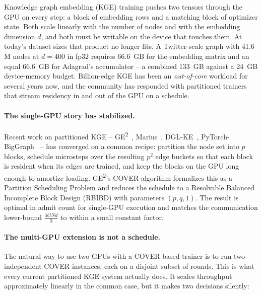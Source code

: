 %

Knowledge graph embedding (KGE) training pushes two tensors through
the GPU on every step: a block of embedding rows and a matching block
of optimizer state. Both scale linearly with the number of nodes and
with the embedding dimension $d$, and both must be writable on the
device that touches them. At today's dataset sizes that product no
longer fits. A Twitter-scale graph with 41.6\,M nodes at $d\!=\!400$ in
fp32 requires \SI{66.6}{GB} for the embedding matrix and an equal
\SI{66.6}{GB} for Adagrad's accumulator -- a combined \SI{133}{GB}
against a \SI{24}{GB} device-memory budget. Billion-edge KGE
has been an \emph{out-of-core} workload for several years now, and the
community has responded with partitioned trainers that stream
residency in and out of the GPU on a schedule.

\paragraph{The single-GPU story has stabilized.}
Recent work on partitioned KGE -- GE\textsuperscript{2}~\cite{ge2_report},
Marius~\cite{marius}, DGL-KE~\cite{dgl_ke}, PyTorch-BigGraph~\cite{pytorch_biggraph} --
has converged on a common recipe: partition the node set into $p$
blocks, schedule microsteps over the resulting $p^2$ edge buckets so
that each block is resident when its edges are trained, and keep the
blocks on the GPU long enough to amortize loading. GE\textsuperscript{2}'s
COVER algorithm formalizes this as a Partition Scheduling Problem and
reduces the schedule to a Resolvable Balanced Incomplete Block Design
(RBIBD) with parameters $(p, q, 1)$. The result is optimal in admit
count for single-GPU execution and matches the communication
lower-bound $\tfrac{4GNd}{3}$ to within a small constant factor.

\paragraph{The multi-GPU extension is not a schedule.}
The natural way to use two GPUs with a COVER-based trainer is to run
two independent COVER instances, each on a disjoint subset of rounds.
This is what every current partitioned KGE system actually does.
It scales throughput approximately linearly in the common case, but
it makes two decisions silently:

